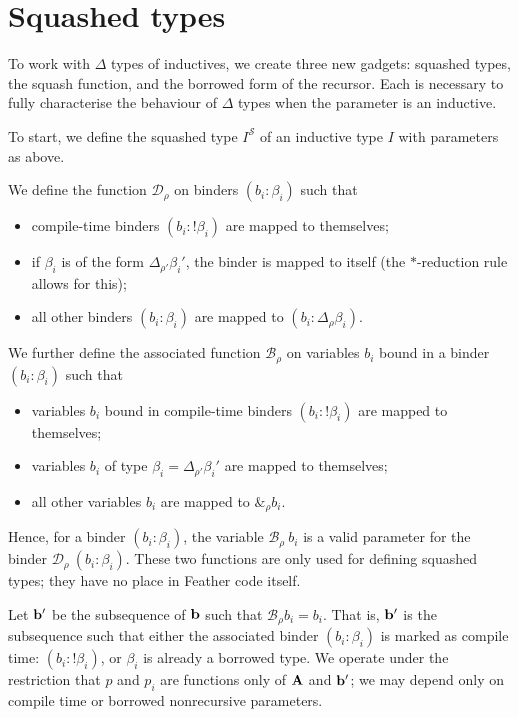 
\section{Squashed types}
To work with \( \Delta \) types of inductives, we create three new gadgets: squashed types, the squash function, and the borrowed form of the recursor.
Each is necessary to fully characterise the behaviour of \( \Delta \) types when the parameter is an inductive.

To start, we define the squashed type \( I^{\mathcal S} \) of an inductive type \( I \) with parameters as above.

\begin{defn}
	We define the function \( \mathcal D_\rho \) on binders \( (b_i : \beta_i) \) such that
	\begin{itemize}
		\item compile-time binders \( (b_i : !\beta_i) \) are mapped to themselves;
		\item if \( \beta_i \) is of the form \( \Delta_{\rho'} \beta_i' \), the binder is mapped to itself (the \( \ast \)-reduction rule allows for this);
		\item all other binders \( (b_i : \beta_i) \) are mapped to \( (b_i : \Delta_{\rho} \beta_i) \).
	\end{itemize}
	We further define the associated function \( \mathcal B_\rho \) on variables \( b_i \) bound in a binder \( (b_i : \beta_i) \) such that
	\begin{itemize}
		\item variables \( b_i \) bound in compile-time binders \( (b_i : !\beta_i) \) are mapped to themselves;
		\item variables \( b_i \) of type \( \beta_i = \Delta_{\rho'} \beta_i' \) are mapped to themselves;
		\item all other variables \( b_i \) are mapped to \( \&_{\rho} b_i \).
	\end{itemize}
	Hence, for a binder \( (b_i : \beta_i) \), the variable \( \mathcal B_\rho\ b_i \) is a valid parameter for the binder \( \mathcal D_\rho\ (b_i : \beta_i) \). These two functions are only used for defining squashed types; they have no place in Feather code itself.
\end{defn}

Let \( \vb b' \) be the subsequence of \( \vb b \) such that \( \mathcal B_\rho b_i = b_i \). That is, \( \vb b' \) is the subsequence such that either the associated binder \( (b_i : \beta_i) \) is marked as compile time: \( (b_i : !\beta_i) \), or \( \beta_i \) is already a borrowed type.
We operate under the restriction that \( p \) and \( p_i \) are functions only of \( \vb A \) and \( \vb b' \); we may depend only on compile time or borrowed nonrecursive parameters.

